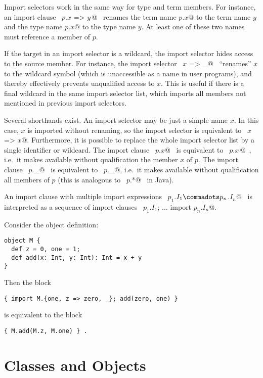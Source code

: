 \documentclass[a4paper,12pt,twoside,titlepage]{book}
\begin{document}
Import selectors work in the same way for type and term members. For
instance, an import clause ~\lstinline@import $p$.{$x$ => $y\,$}@~ renames the term
name \lstinline@$p$.$x$@ to the term name $y$ and the type name \lstinline@$p$.$x$@
to the type name $y$. At least one of these two names must
reference a member of $p$.

If the target in an import selector is a wildcard, the import selector
hides access to the source member. For instance, the import selector
~\lstinline@$x$ => _@~ ``renames'' $x$ to the wildcard symbol (which is
unaccessible as a name in user programs), and thereby effectively
prevents unqualified access to $x$. This is useful if there is a
final wildcard in the same import selector list, which imports all
members not mentioned in previous import selectors.

Several shorthands exist. An import selector may be just a simple name
$x$. In this case, $x$ is imported without renaming, so the
import selector is equivalent to ~\lstinline@$x$ => $x$@. Furthermore, it is
possible to replace the whole import selector list by a single
identifier or wildcard. The import clause ~\lstinline@import $p$.$x$@~ is
equivalent to ~\lstinline@import $p$.{$x\,$}@~, i.e.\ it makes available without
qualification the member $x$ of $p$. The import clause
~\lstinline@import $p$._@~ is equivalent to
~\lstinline@import $p$.{_}@, 
i.e.\ it makes available without qualification all members of $p$
(this is analogous to ~\lstinline@import $p$.*@~ in Java).

An import clause with multiple import expressions
~\lstinline@import $p_1$.$I_1 \commadots p_n$.$I_n$@~ is interpreted as a
sequence of import clauses 
~\lstinline@import $p_1$.$I_1$; $\ldots$ import $p_n$.$I_n$@.

\example Consider the object definition:
\begin{lstlisting}
object M { 
  def z = 0, one = 1; 
  def add(x: Int, y: Int): Int = x + y 
}
\end{lstlisting}
Then the block
\begin{lstlisting}
{ import M.{one, z => zero, _}; add(zero, one) }
\end{lstlisting}
is equivalent to the block 
\begin{lstlisting}
{ M.add(M.z, M.one) } .
\end{lstlisting}

\chapter{Classes and Objects}
\label{sec:globaldefs}
\end{document}
